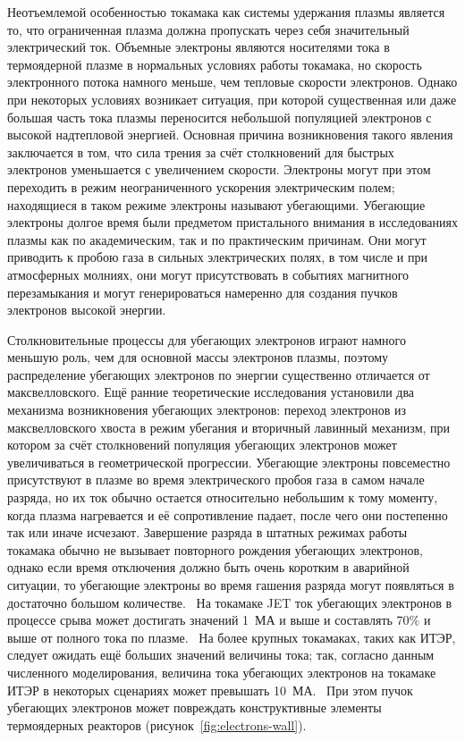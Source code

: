 
{\actuality}

Неотъемлемой особенностью токамака как системы удержания плазмы является то, что ограниченная плазма должна пропускать через себя значительный электрический ток. Объемные электроны являются носителями тока в термоядерной плазме в нормальных условиях работы токамака, но скорость электронного потока намного меньше, чем тепловые скорости электронов. Однако при некоторых условиях возникает ситуация, при которой существенная или даже большая часть тока плазмы переносится небольшой популяцией электронов с высокой надтепловой энергией. Основная причина возникновения такого явления заключается в том, что сила трения за счёт столкновений для быстрых электронов уменьшается с увеличением скорости. Электроны могут при этом переходить в режим неограниченного ускорения электрическим полем; находящиеся в таком режиме электроны называют убегающими. Убегающие электроны долгое время были предметом пристального внимания в исследованиях плазмы как по академическим, так и по практическим причинам. Они могут приводить к пробою газа в сильных электрических полях, в том числе и при атмосферных молниях, они могут присутствовать в событиях магнитного перезамыкания и могут генерироваться намеренно для создания пучков электронов высокой энергии.~\cite{Breizman2019}

Столкновительные процессы для убегающих электронов играют намного меньшую роль, чем для основной массы электронов плазмы, поэтому распределение убегающих электронов по энергии существенно отличается от максвелловского. Ещё ранние теоретические исследования установили два механизма возникновения убегающих электронов: переход электронов из максвелловского хвоста в режим убегания и вторичный лавинный механизм, при котором за счёт столкновений популяция убегающих электронов может увеличиваться в геометрической прогрессии. Убегающие электроны повсеместно присутствуют в плазме во время электрического пробоя газа в самом начале разряда, но их ток обычно остается относительно небольшим к тому моменту, когда плазма нагревается и её сопротивление падает, после чего они постепенно так или иначе исчезают. Завершение разряда в штатных режимах работы токамака обычно не вызывает повторного рождения убегающих электронов, однако если время отключения должно быть очень коротким в аварийной ситуации, то убегающие электроны во время гашения разряда могут появляться в достаточно большом количестве.~\cite{Breizman2019} На токамаке JET ток убегающих электронов в процессе срыва может достигать значений 1~МА и выше и составлять 70\% и выше от полного тока по плазме.~\cite{Smith2006} 
На более крупных токамаках, таких как ИТЭР, следует ожидать ещё больших значений величины тока; так, согласно данным численного моделирования, величина тока убегающих электронов на токамаке ИТЭР в некоторых сценариях может превышать 10~МА.~\cite{Smith2006} При этом пучок убегающих электронов может повреждать конструктивные элементы термоядерных реакторов (рисунок~\ref{fig:electrons-wall}).~\cite{Bazylev2011}

